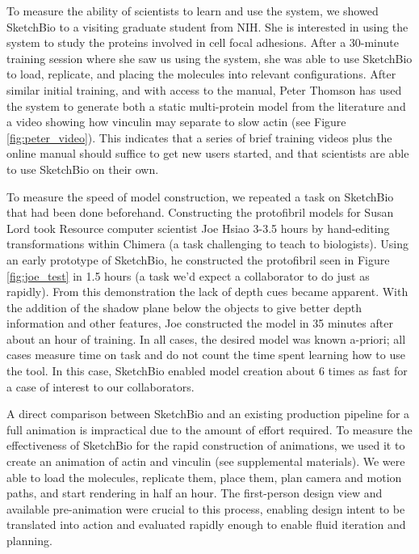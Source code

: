 \documentclass[twocolumn]{bmcart}%
\begin{document}
To measure the ability of scientists to learn and use the system, we showed SketchBio to a visiting graduate student from NIH.  She is interested in using the system to study the proteins involved in cell focal adhesions.  After a 30-minute training session where she saw us using the system, she was able to use SketchBio to load, replicate, and placing the molecules into relevant configurations.  After similar initial training, and with access to the manual, Peter Thomson has used the system to generate both a static multi-protein model from the literature and a video showing how vinculin may separate to slow actin (see Figure \ref{fig:peter_video}).   This indicates that a series of brief training videos plus the online manual should suffice to get new users started, and that scientists are able to use SketchBio on their own.

To measure the speed of model construction, we repeated a task on SketchBio that had been done beforehand.  Constructing the protofibril models for Susan Lord took Resource computer scientist Joe Hsiao 3-3.5 hours by hand-editing transformations within Chimera (a task challenging to teach to biologists).  Using an early prototype of SketchBio, he constructed the protofibril seen in Figure \ref{fig:joe_test} in 1.5 hours (a task we'd expect a collaborator to do just as rapidly).  From this demonstration the lack of depth cues became apparent.  With the addition of the shadow plane below the objects to give better depth information and other features, Joe constructed the model in 35 minutes after about an hour of training.  In all cases, the desired model was known a-priori; all cases measure time on task and do not count the time spent learning how to use the tool.  In this case, SketchBio enabled model creation about 6 times as fast for a case of interest to our collaborators.

A direct comparison between SketchBio and an existing production pipeline for a full animation is impractical due to the amount of effort required.  To measure the effectiveness of SketchBio for the rapid construction of animations, we used it to create an animation of actin and vinculin (see supplemental materials).  We were able to load the molecules, replicate them, place them, plan camera and motion paths, and start rendering in half an hour.  The first-person design view and available pre-animation were crucial to this process, enabling design intent to be translated into action and evaluated rapidly enough to enable fluid iteration and planning.
\end{document}
